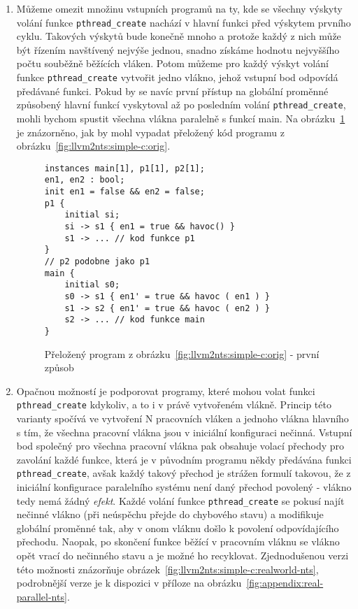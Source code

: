 \documentclass{fithesis2}
\begin{document}
\begin{enumerate}
\item Můžeme omezit množinu vstupních programů na ty, kde se všechny výskyty volání funkce \texttt{pthread\_create} nachází v hlavní funkci před výskytem prvního cyklu. Takových výskytů bude konečně mnoho a protože každý z nich může být řízením navštívený nejvýše jednou, snadno získáme hodnotu nejvyššího počtu souběžně běžících vláken. Potom můžeme pro každý výskyt volání funkce \texttt{pthread\_create} vytvořit jedno vlákno, jehož vstupní bod odpovídá předávané funkci. Pokud by se navíc první přístup na globální proměnné způsobený hlavní funkcí vyskytoval až po posledním volání \texttt{pthread\_create}, mohli bychom spustit všechna vlákna paralelně s funkcí main. Na obrázku~\ref{fig:llvm2nts:simple-c:simple-nts} je znázorněno, jak by mohl vypadat přeložený kód programu z obrázku~\ref{fig:llvm2nts:simple-c:orig}.

\begin{figure}[t]
\begin{lstlisting}
instances main[1], p1[1], p2[1];
en1, en2 : bool;
init en1 = false && en2 = false;
p1 {
	initial si;
	si -> s1 { en1 = true && havoc() }
	s1 -> ... // kod funkce p1
}
// p2 podobne jako p1
main {
	initial s0;
	s0 -> s1 { en1' = true && havoc ( en1 ) }
	s1 -> s2 { en1' = true && havoc ( en2 ) }
	s2 -> ... // kod funkce main
}
\end{lstlisting}
\caption{Přeložený program z obrázku~\ref{fig:llvm2nts:simple-c:orig} - první způsob}
\label{fig:llvm2nts:simple-c:simple-nts}
\end{figure}

\item Opačnou možností je podporovat programy, které mohou volat funkci \texttt{pthread\_create} kdykoliv, a to i v právě vytvořeném vlákně. Princip této varianty spočívá ve vytvoření N pracovních vláken a jednoho vlákna hlavního s tím, že všechna pracovní vlákna jsou v iniciální konfiguraci nečinná. Vstupní bod společný pro všechna pracovní vlákna pak obsahuje volací přechody pro zavolání každé funkce, která je v původním programu někdy předávána funkci \texttt{pthread\_create}, avšak každý takový přechod je strážen formulí takovou, že z iniciální konfigurace paralelního systému není daný přechod povolený - vlákno tedy nemá žádný \textit{efekt}. Každé volání funkce \texttt{pthread\_create} se pokusí najít nečinné vlákno (při neúspěchu přejde do chybového stavu) a modifikuje globální proměnné tak, aby v onom vláknu došlo k povolení odpovídajícího přechodu. Naopak, po skončení funkce běžící v pracovním vláknu se vlákno opět vrací do nečinného stavu a je možné ho recyklovat. Zjednodušenou verzi této možnosti znázorňuje obrázek~\ref{fig:llvm2nts:simple-c:realworld-nts}, podrobnější verze je k dispozici v příloze na obrázku~\ref{fig:appendix:real-parallel-nts}.
\end{enumerate}
\end{document}

